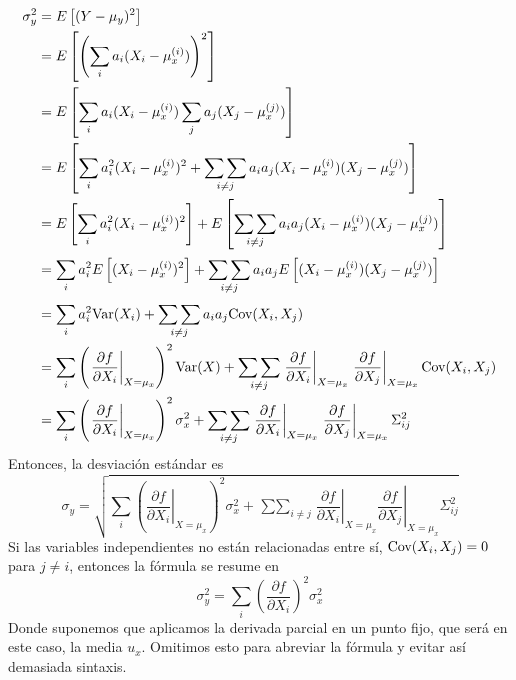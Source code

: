\documentclass[a4paper, 10pt]{article}
\begin{document}
\begin{equation}
    \begin{split}
        \sigma_y^{2} &= E\left[(Y-\mu_y)^{2}\right] \\
        &=E\left[\left(\sum_{i}^{}{a_i(X_i-\mu_x^{(i)})}\right)^{2}\right] \\
        &=E\left[\sum_{i}^{}{a_i(X_i-\mu_x^{(i)})} \sum_{j}^{}{a_j(X_j-\mu_x^{(j)})}\right] \\
        &=E\left[\sum_{i}^{}{a_i^{2}(X_i-\mu_x^{(i)})^{2}}+\mathop{\sum\sum}_{i\neq j}{a_i a_j (X_i-\mu_x^{(i)})(X_j-\mu_x^{(j)})}\right] \\
        &=E\left[\sum_{i}^{}{a_i^{2}(X_i-\mu_x^{(i)})^{2}}\right]+E\left[\mathop{\sum\sum}_{i\neq j}{a_i a_j (X_i-\mu_x^{(i)})(X_j-\mu_x^{(j)})}\right] \\
        &=\sum_{i}^{}a_i^{2}E\left[{(X_i-\mu_x^{(i)})^{2}}\right]+\mathop{\sum\sum}_{i\neq j}a_i a_jE\left[{ (X_i-\mu_x^{(i)})(X_j-\mu_x^{(j)})}\right] \\
        &=\sum_{i}^{}a_i^{2}\textnormal{Var}(X_i)+\mathop{\sum\sum}_{i\neq j} a_i a_j\textnormal{Cov}(X_i, X_j) \\
        &=\sum_{i}^{}\left(\left.\dfrac{\partial f}{\partial X_i}\right\rvert_{X=\mu_x}\right)^{2}\textnormal{Var}(X)+\mathop{\sum\sum}_{i\neq j} \left.\dfrac{\partial f}{\partial X_i}\right\rvert_{X=\mu_x} \left.\dfrac{\partial f}{\partial X_j}\right\rvert_{X=\mu_x}\textnormal{Cov}(X_i, X_j) \\
        &=\sum_{i}^{}\left(\left.\dfrac{\partial f}{\partial X_i}\right\rvert_{X=\mu_x}\right)^{2}\sigma^{2}_x+\mathop{\sum\sum}_{i\neq j} \left.\dfrac{\partial f}{\partial X_i}\right\rvert_{X=\mu_x} \left.\dfrac{\partial f}{\partial X_j}\right\rvert_{X=\mu_x}\Sigma^{2}_{ij} \\
    \end{split}
\end{equation}
Entonces, la desviación estándar es
\begin{equation}
    \sigma_y=\sqrt{\sum_{i}^{}\left(\left.\dfrac{\partial f}{\partial X_i}\right\rvert_{X=\mu_x}\right)^{2}\sigma^{2}_x+\mathop{\sum\sum}_{i\neq j} \left.\dfrac{\partial f}{\partial X_i}\right\rvert_{X=\mu_x} \left.\dfrac{\partial f}{\partial X_j}\right\rvert_{X=\mu_x}\Sigma^{2}_{ij}}
\end{equation}
Si las variables independientes no están relacionadas entre sí, $\textnormal{Cov}(X_i, X_j) = 0$ para $j\neq i$,
entonces la fórmula se resume en
\begin{equation}
    \sigma_y^{2} = \sum_{i}^{}\left(\dfrac{\partial f}{\partial X_i}\right)^{2}\sigma^{2}_x
\end{equation}
Donde suponemos que aplicamos la derivada parcial en un punto fijo, que será en este caso, la media $u_x$.
Omitimos esto para abreviar la fórmula y evitar así demasiada sintaxis.
\end{document}
